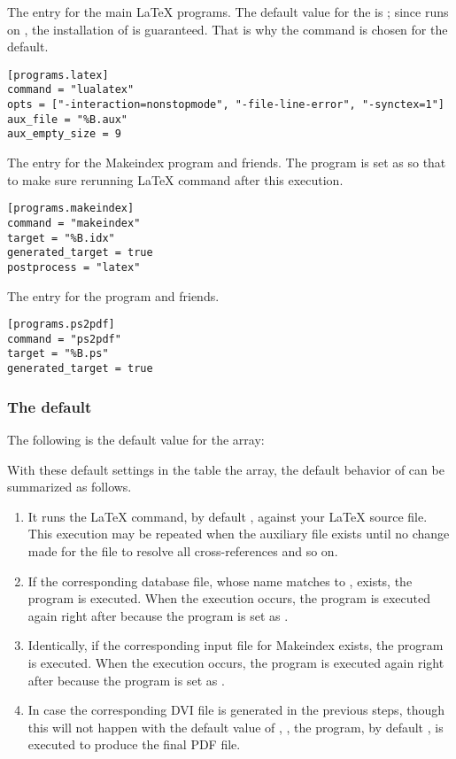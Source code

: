 \documentclass[draft]{llmk-doc}
\begin{document}
 The entry for the main {\LaTeX} programs. The default value for
the  is ; since  runs on
, the installation of {\LuaTeX} is guaranteed. That is why the
command is chosen for the default.
%
\begin{lstlisting}[style=toml]
[programs.latex]
command = "lualatex"
opts = ["-interaction=nonstopmode", "-file-line-error", "-synctex=1"]
aux_file = "%B.aux"
aux_empty_size = 9
\end{lstlisting}

 The entry for the Makeindex program and friends. The
 program is set as  so that to make sure
rerunning {\LaTeX} command after this execution.
%
\begin{lstlisting}[style=toml]
[programs.makeindex]
command = "makeindex"
target = "%B.idx"
generated_target = true
postprocess = "latex"
\end{lstlisting}

 The entry for the  program and friends.
%
\begin{lstlisting}[style=toml]
[programs.ps2pdf]
command = "ps2pdf"
target = "%B.ps"
generated_target = true
\end{lstlisting}

\subsubsection{The default }
\label{sec:default-sequence}

The following is the default value for the  array:
%
\begin{htcode}
\end{htcode}

With these default settings in the  table the 
array, the default behavior of  can be summarized as follows.
%
\begin{enumerate}
\item It runs the {\LaTeX} command, by default {\LuaLaTeX}, against your
  {\LaTeX} source file. This execution may be repeated when the auxiliary file
  exists until no change made for the file to resolve all cross-references and
  so on.
\item If the corresponding {\BibTeX} database file, whose name matches to
  , exists, the {\BibTeX} program is executed. When the execution
  occurs, the  program is executed again right after because
  the program is set as .
\item Identically, if the corresponding input file for Makeindex exists, the
  program is executed. When the execution occurs, the  program
  is executed again right after because the program is set as .
\item In case the corresponding DVI file is generated in the previous steps,
  though this will not happen with the default value of , \ie
  , the  program, by default ,
  is executed to produce the final PDF file.
\end{enumerate}
\end{document}
